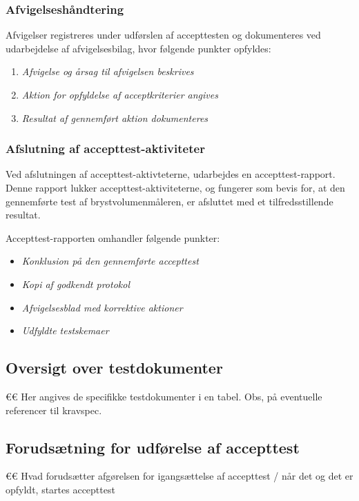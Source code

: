 			\subsubsection{Afvigelseshåndtering}	
			Afvigelser registreres under udførslen af accepttesten og dokumenteres ved udarbejdelse af afvigelsesbilag, hvor følgende punkter opfyldes:
			
			\begin{enumerate}[label=\alph*)]
				\item \textit{Afvigelse og årsag til afvigelsen beskrives}
				\item \textit{Aktion for opfyldelse af acceptkriterier angives}
				\item \textit{Resultat af gennemført aktion dokumenteres}	
			\end{enumerate}
			
			\subsubsection{Afslutning af accepttest-aktiviteter}
			Ved afslutningen af accepttest-aktivteterne, udarbejdes en accepttest-rapport. Denne rapport lukker accepttest-aktiviteterne, og fungerer som bevis for, at den gennemførte test af brystvolumenmåleren, er afsluttet med et tilfredsstillende resultat. 
			
			Accepttest-rapporten omhandler følgende punkter: 
			\begin{itemize}
				\item \textit{Konklusion på den gennemførte accepttest}
				\item \textit{Kopi af godkendt protokol}
				\item \textit{Afvigelsesblad med korrektive aktioner}
				\item \textit{Udfyldte testskemaer}
			\end{itemize}
			
		\subsection{Oversigt over testdokumenter}
		€€ Her angives de specifikke testdokumenter i en tabel. Obs, på eventuelle referencer til kravspec. 
		
		\subsection{Forudsætning for udførelse af accepttest}
		€€ Hvad forudsætter afgørelsen for igangsættelse af accepttest / når det og det er opfyldt, startes accepttest 
		
